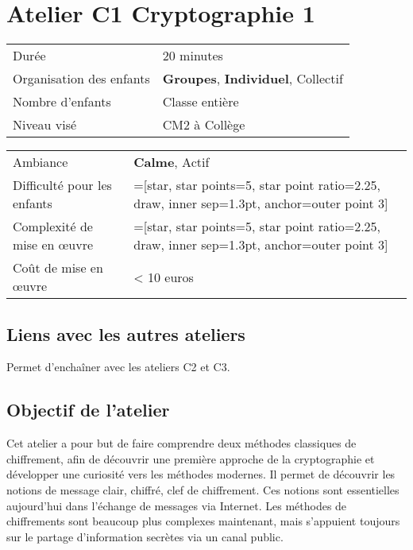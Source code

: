 \documentclass[a4paper]{article}
\newcommand\score[2]{%
  \pgfmathsetmacro\pgfxa{#1 + 1}%
  \tikzstyle{scorestars}=[star, star points=5, star point ratio=2.25, draw, inner sep=1.3pt, anchor=outer point 3]%
  \begin{tikzpicture}[baseline]
    \foreach \i in {1, ..., #2} {
      \pgfmathparse{\i<=#1 ? "yellow" : "gray"}
      \edef\starcolor{\pgfmathresult}
      \draw (\i*1.75ex, 0) node[name=star\i, scorestars, fill=\starcolor]  {};
   }
  \end{tikzpicture}%
}
\begin{document}
 
\section{Atelier C1 \hfill Cryptographie 1}

{
\setlength\arrayrulewidth{2pt}

\begin{minipage}{.55\textwidth}
  \begin{tabularx}{\textwidth}{|l|X|}
    \hline
    Durée                    & 20 minutes \\
    Organisation des enfants & {\bf Groupes}, {\bf Individuel}, Collectif \\
    Nombre d'enfants         & Classe entière \\
    Niveau visé              & CM2 à Collège \\
    \hline
  \end{tabularx}
\end{minipage}
\begin{minipage}{.45\textwidth}
  \begin{tabularx}{\textwidth}{|l|X|}
    \hline
    Ambiance                       & {\bf Calme}, Actif \\
    Difficulté pour les enfants    & \score{2}{5} \\
    Complexité de mise en \oe uvre & \score{2}{5} \\
    Coût de mise en \oe uvre       & < 10 euros \\
    \hline
  \end{tabularx}
\end{minipage}
}

\subsection{Liens avec les autres ateliers}

Permet d'enchaîner avec les ateliers C2 et C3.

\subsection{Objectif de l'atelier}
Cet atelier a pour but de faire comprendre deux méthodes classiques de chiffrement, afin de découvrir une première approche de la cryptographie et développer une curiosité vers les méthodes modernes. Il permet de découvrir les notions de message clair, chiffré, clef de chiffrement. Ces notions sont essentielles aujourd'hui dans l'échange de messages via Internet. Les méthodes de chiffrements sont beaucoup plus complexes maintenant, mais s'appuient toujours sur le partage d'information secrètes via un canal public.
\end{document}

